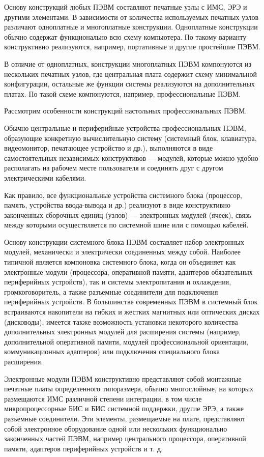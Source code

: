\documentclass[unicode, 12pt, a4paper, oneside]{article}
\begin{document}
Основу конструкций любых ПЭВМ составляют печатные узлы с ИМС, ЭРЭ и другими элементами. В зависимости от количества используемых печатных узлов различают одноплатные и многоплатные конструкции. Одноплатные конструкции обычно содержат функционально всю схему компьютера. По такому варианту конструктивно реализуются, например, портативные и другие простейшие ПЭВМ.

В отличие от одноплатных, конструкции многоплатных ПЭВМ компонуются из нескольких печатных узлов, где центральная плата содержит схему минимальной конфигурации, остальные же функции системы реализуются на дополнительных платах. По такой схеме компонуются, например, профессиональные ПЭВМ.

Рассмотрим особенности конструкций настольных профессиональных ПЭВМ.

Обычно центральные и периферийные устройства профессиональных ПЭВМ, образующие конкретную вычислительную систему (системный блок, клавиатура, видеомонитор, печатающее устройство и др.), выполняются в виде самостоятельных независимых конструктивов — модулей, которые можно удобно располагать на рабочем месте пользователя и соединять друг с другом электрическими кабелями.

Как правило, все функциональные устройства системного блока (процессор, память, устройства ввода-вывода и др.) реализуют в виде конструктивно законченных сборочных единиц (узлов) — электронных модулей (ячеек), связь между которыми осуществляется по системной шине или с помощью кабелей.

Основу конструкции системного блока ПЭВМ составляет набор электронных модулей, механически и электрически соединенных между собой. Наиболее типичной является компоновка системного блока, когда он объединяет как электронные модули (процессора, оперативной памяти, адаптеров обязательных периферийных устройств), так и системы электропитания и охлаждения, громкоговоритель, а также разъемные соединители для подключения периферийных устройств. В большинстве современных ПЭВМ в системный блок встраиваются накопители на гибких и жестких магнитных или оптических дисках (дисководы), имеется также возможность установки некоторого количества дополнительных электронных модулей для расширения системы (например, дополнительной оперативной памяти, модулей профессиональной ориентации, коммуникационных адаптеров) или подключения специального блока расширения.

Электронные модули ПЭВМ конструктивно представляют собой монтажные печатные платы определенного типоразмера, обычно многослойные, на которых размещаются ИМС различной степени интеграции, в том числе микропроцессорные БИС и БИС системной поддержки, другие ЭРЭ, а также разъемные соединители. Эти элементы, размещаемые на плате, представляют собой электронное оборудование одной или нескольких функционально законченных частей ПЭВМ, например центрального процессора, оперативной памяти, адаптеров периферийных устройств и т. д.
\end{document}
